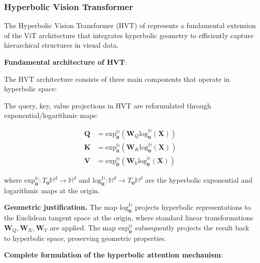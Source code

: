 \subsubsection{Hyperbolic Vision \gls{Transformer}}

The Hyperbolic Vision Transformer (HVT) of \citet{hvt2024hyperbolic} represents a fundamental extension of the \gls{ViT} architecture that integrates hyperbolic geometry to efficiently capture hierarchical structures in visual data.

\textbf{Fundamental architecture of HVT}:

The HVT architecture consists of three main components that operate in hyperbolic space:

\begin{definition}\label{def:hvt_projections}
The query, key, value projections in HVT are reformulated through exponential/logarithmic maps:

\begin{align}
    \mathbf{Q} &= \text{exp}_{\mathbf{0}}^{\mathbb{H}}(\mathbf{W}_Q \text{log}_{\mathbf{0}}^{\mathbb{H}}(\mathbf{X})) \\
    \mathbf{K} &= \text{exp}_{\mathbf{0}}^{\mathbb{H}}(\mathbf{W}_K \text{log}_{\mathbf{0}}^{\mathbb{H}}(\mathbf{X})) \\
    \mathbf{V} &= \text{exp}_{\mathbf{0}}^{\mathbb{H}}(\mathbf{W}_V \text{log}_{\mathbf{0}}^{\mathbb{H}}(\mathbf{X}))
    \label{eq:hyperbolic_projections}
\end{align}

where $\text{exp}_{\mathbf{0}}^{\mathbb{H}}: T_{\mathbf{0}}\mathbb{H}^d \to \mathbb{H}^d$ and $\text{log}_{\mathbf{0}}^{\mathbb{H}}: \mathbb{H}^d \to T_{\mathbf{0}}\mathbb{H}^d$ are the hyperbolic exponential and logarithmic maps at the origin.
\end{definition}

\textbf{Geometric justification.}\label{rem:hvt_geometry} The map $\text{log}_{\mathbf{0}}^{\mathbb{H}}$ projects hyperbolic representations to the Euclidean tangent space at the origin, where standard linear transformations $\mathbf{W}_Q, \mathbf{W}_K, \mathbf{W}_V$ are applied. The map $\text{exp}_{\mathbf{0}}^{\mathbb{H}}$ subsequently projects the result back to hyperbolic space, preserving geometric properties.

\textbf{Complete formulation of the hyperbolic attention mechanism}:

